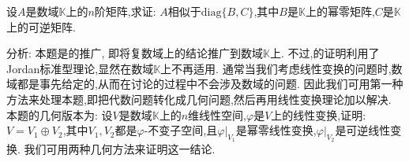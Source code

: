 \documentclass[../../main.tex]{subfiles}%
\begin{document}
\begin{proposition}\label{proposition:数域K上矩阵的相似(幂零和可逆)分解}
设$A$是数域$\mathbb{K}$上的$n$阶矩阵,求证: $A$相似于$\mathrm{diag}\{B,C\}$,其中$B$是$\mathbb{K}$上的幂零矩阵,$C$是$\mathbb{K}$上的可逆矩阵.
\end{proposition}
\begin{remark}
分析: 本题是的推广, 即将复数域上的结论推广到数域$\mathbb{K}$上. 不过,的证明利用了Jordan标准型理论,显然在数域$\mathbb{K}$上不再适用. 通常当我们考虑线性变换的问题时,数域都是事先给定的,从而在讨论的过程中不会涉及数域的问题. 因此我们可用第一种方法来处理本题,即把代数问题转化成几何问题,然后再用线性变换理论加以解决. 本题的几何版本为: 设$V$是数域$\mathbb{K}$上的$n$维线性空间,$\varphi$是$V$上的线性变换,证明: $V = V_1\oplus V_2$,其中$V_1,V_2$都是$\varphi$-不变子空间,且$\varphi|_{V_1}$是幂零线性变换,$\varphi|_{V_2}$是可逆线性变换. 我们可用两种几何方法来证明这一结论.
\end{remark}
\end{document}
